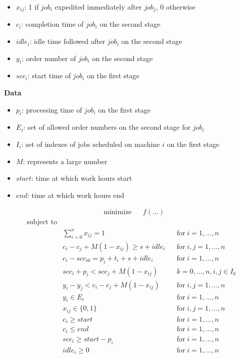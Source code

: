 \documentclass{ctuthesis}
\begin{document}
\begin{itemize}
\item $x_{ij}$: 1 if $job_i$ expedited immediately after $job_j$, 0 otherwise
\item$c_i$: completion time of $job_i$ on the second stage
\item$idle_i$: idle time followed after $job_i$ on the second stage
\item$y_i$: order number of $job_i$ on the second stage
\item$scc_i$: start time of $job_i$ on the first stage 
\end{itemize}
\textbf{Data}
\begin{itemize}
\item$p_i$: processing time of $job_i$ on the first stage
\item$E_i$: set of allowed order numbers on the second stage for $job_i$
\item$I_i$: set of indexes of jobs scheduled on machine $i$ on the first stage
\item$M$: represents a large number
\item$start$: time at which work hours start
\item$end$: time at which work hours end
\end{itemize}

\begin{equation}
\begin{aligned}
&\text{minimize}
&&f(\ldots)
\end{aligned}
\end{equation}
\begin{equation}
\begin{aligned}
\text{subject to}\\
& \sum_{i=0}^{n} x_{ij} = 1 && \text{for}\; i = 1, \ldots, n\\
& c_{i} - c_{j} + M(1 - x_{ij}) \geq s + idle_{i} && \text{for}\; i,j = 1, \ldots, n\\
& c_{i} - scc_{i0} = p_{i} + t_i + s + idle_i && \text{for}\; i = 1, \ldots, n\\
& scc_{i} + p_i < scc_j + M(1 - x_{ij}) && k = 0,\ldots,n, i,j \in I_k\\
& y_{i} - y_{j} < c_i - c_j + M(1 - x_{ij}) && \text{for}\; i,j = 1, \ldots, n\\
& y_i \in E_i && \text{for}\; i = 1, \ldots, n\\
& x_{ij} \in \{0, 1\}  && \text{for}\; i,j = 1, \ldots, n\\ 
& c_i \geq start && \text{for}\; i = 1, \ldots, n\\
& c_i \leq end && \text{for}\; i = 1, \ldots, n\\
& scc_{i} \geq start - p_i && \text{for}\; i = 1, \ldots, n\\
& idle_i \geq 0 && \text{for}\; i = 1, \ldots, n\\
\end{aligned}
\end{equation}
\end{document}
